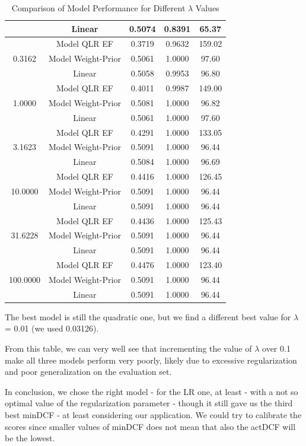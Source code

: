 \documentclass[12pt, a4paper]{article}
\begin{document}
\begin{table}[h]
\begin{tabular}{|| c  c  c  c  c ||}
 & Linear & 0.5074 & 0.8391 & 65.37 \\
\hline
\multirow{3}{*}{0.3162}
 & Model QLR EF & 0.3719 & 0.9632 & 159.02 \\
 & Model Weight-Prior & 0.5061 & 1.0000 & 97.60 \\
 & Linear & 0.5058 & 0.9953 & 96.80 \\
\hline
\multirow{3}{*}{1.0000}
 & Model QLR EF & 0.4011 & 0.9987 & 149.00 \\
 & Model Weight-Prior & 0.5081 & 1.0000 & 96.82 \\
 & Linear & 0.5061 & 1.0000 & 97.60 \\
\hline
\multirow{3}{*}{3.1623}
 & Model QLR EF & 0.4291 & 1.0000 & 133.05 \\
 & Model Weight-Prior & 0.5091 & 1.0000 & 96.44 \\
 & Linear & 0.5084 & 1.0000 & 96.69 \\
\hline
\multirow{3}{*}{10.0000}
 & Model QLR EF & 0.4416 & 1.0000 & 126.45 \\
 & Model Weight-Prior & 0.5091 & 1.0000 & 96.44 \\
 & Linear & 0.5091 & 1.0000 & 96.44 \\
\hline
\multirow{3}{*}{31.6228}
 & Model QLR EF & 0.4436 & 1.0000 & 125.43 \\
 & Model Weight-Prior & 0.5091 & 1.0000 & 96.44 \\
 & Linear & 0.5091 & 1.0000 & 96.44 \\
\hline
\multirow{3}{*}{100.0000}
 & Model QLR EF & 0.4476 & 1.0000 & 123.40 \\
 & Model Weight-Prior & 0.5091 & 1.0000 & 96.44 \\
 & Linear & 0.5091 & 1.0000 & 96.44 \\
\hline
\end{tabular}
\caption{Comparison of Model Performance for Different $\lambda$ Values}
\label{tab:model-comparison}
\end{table}
\clearpage

The best model is still the quadratic one, but we find a different best value for $\lambda$ = 0.01 (we used 0.03126).

From this table, we can very well see that incrementing the value of $\lambda$ over 0.1 make all three models perform very poorly, likely due to excessive regularization and poor generalization on the evaluation set.

In conclusion, we chose the right model - for the LR one, at least - with a not so optimal value of the regularization parameter - though it still gave us the third best minDCF - at least considering our application. We could try to calibrate the scores since smaller values of minDCF does not mean that also the actDCF will be the lowest.
\end{document}
